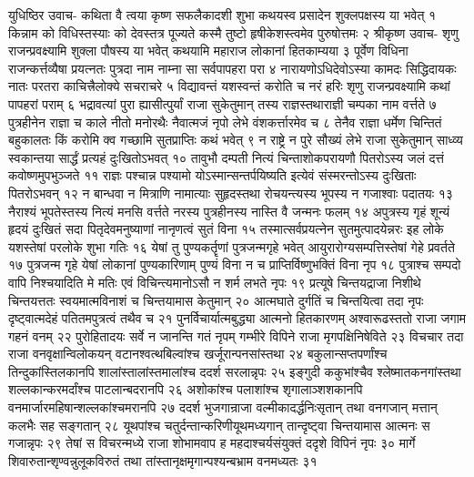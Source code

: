 युधिष्ठिर उवाच-
कथिता वै त्वया कृष्ण सफलैकादशी शुभा 
कथयस्व प्रसादेन शुक्लपक्षस्य या भवेत् १
किन्नाम को विधिस्तस्याः को देवस्तत्र पूज्यते 
कस्मै तुष्टो हृषीकेशस्त्वमेव पुरुषोत्तमः २
श्रीकृष्ण उवाच-
शृणु राजन्प्रवक्ष्यामि शुक्ला पौषस्य या भवेत् 
कथयामि महाराज लोकानां हितकाम्यया ३
पूर्वेण विधिना राजन्कर्त्तव्यैषा प्रयत्नतः 
पुत्रदा नाम नाम्ना सा सर्वपापहरा परा ४
नारायणोऽधिदेवोऽस्या कामदः सिद्धिदायकः 
नातः परतरा काचित्त्रैलोक्ये सचराचरे ५
विद्यावन्तं यशस्वन्तं करोति च नरं हरिः 
शृणु राजन्प्रवक्ष्यामि कथां पापहरां पराम् ६
भद्रावत्यां पुरा ह्यासीत्पुर्यां राजा सुकेतुमान् 
तस्य राज्ञस्तथाराज्ञी चम्पका नाम वर्त्तते ७
पुत्रहीनेन राज्ञा च काले नीतो मनोरथैः 
नैवात्मजं नृपो लेभे वंशकर्त्तारमेव च ८
तेनैव राज्ञा धर्मेण चिन्तितं बहुकालतः 
किं करोमि क्व गच्छामि सुतप्राप्तिः कथं भवेत् ९
न राष्ट्रे न पुरे सौख्यं लेभे राजा सुकेतुमान् 
साध्व्य स्वकान्तया सार्द्धं प्रत्यहं दुःखितोऽभवत् १०
तावुभौ दम्पती नित्यं चिन्ताशोकपरायणौ 
पितरोऽस्य जलं दत्तं कवोष्णमुपभुञ्जते ११
राज्ञः पश्चान्न पश्यामो योऽस्मान्सन्तर्पयिष्यति 
इत्येवं संस्मरन्तोऽस्य दुःखिताः पितरोऽभवन् १२
न बान्धवा न मित्राणि नामात्याः सुहृदस्तथा 
रोचयन्त्यस्य भूपस्य न गजाश्वाः पदातयः १३
नैराश्यं भूपतेस्तस्य नित्यं मनसि वर्त्तते 
नरस्य पुत्रहीनस्य नास्ति वै जन्मनः फलम् १४
अपुत्रस्य गृहं शून्यं हृदयं दुःखितं सदा 
पितृदेवमनुष्याणां नानृणत्वं सुतं विना १५
तस्मात्सर्वप्रयत्नेन सुतमुत्पादयेन्नरः 
इह लोके यशस्तेषां परलोके शुभा गतिः १६
येषां तु पुण्यकर्तॄणां पुत्रजन्मगृहे भवेत् 
आयुरारोग्यसम्पत्तिस्तेषां गेहे प्रवर्तते १७
पुत्रजन्म गृहे येषां लोकानां पुण्यकारिणाम् 
पुण्यं विना न च प्राप्तिर्विष्णुभक्तिं विना नृप १८
पुत्राश्च सम्पदो वापि निश्चयादिति मे मतिः 
एवं विचिन्त्यमानोऽसौ न शर्म लभते नृपः १९
प्रत्यूषे चिन्तयद्राजा निशीथे चिन्तयत्ततः 
स्वयमात्मविनाशं च चिन्तयामास केतुमान् २०
आत्मघाते दुर्गतिं च चिन्तयित्वा तदा नृपः 
दृष्ट्वात्मदेहं पतितमपुत्रत्वं तथैव च २१
पुनर्विचार्यात्मबुद्ध्या आत्मनो हितकारणम् 
अश्वारूढस्ततो राजा जगाम गहनं वनम् २२
पुरोहितादयः सर्वे न जानन्ति गतं नृपम् 
गम्भीरे विपिने राजा मृगपक्षिनिषेविते २३
विचचार तदा राजा वनवृक्षान्विलोकयन् 
वटानश्वत्थबिल्वांश्च खर्जूरान्पनसांस्तथा २४
बकुलान्सप्तपर्णांश्च तिन्दुकांस्तिलकानपि 
शालांस्तालांस्तमालांश्च ददर्श सरलान्नृपः २५
इङ्गुदी ककुभांश्चैव श्लेष्मातकनगांस्तथा 
शल्लकान्करमर्दांश्च पाटलान्बदरानपि २६
अशोकांश्च पलाशांश्च शृगालाञ्शशकानपि 
वनमार्जारमहिषान्शल्लकांश्चमरानपि २७
ददर्श भुजगान्राजा वल्मीकादर्द्धनिःसृतान् 
तथा वनगजान् मत्तान् कलभैः सह सङ्गतान् २८
यूथपांश्च चतुर्दन्तान्करिणीयूथमध्यगान् 
तान्दृष्ट्वा चिन्तयामास आत्मनः स गजान्नृपः २९
तेषां स विचरन्मध्ये राजा शोभामवाप ह 
महदाश्चर्यसंयुक्तं ददृशे विपिनं नृपः ३०
मार्गे शिवारुतान्शृण्वन्नुलूकविरुतं तथा 
तांस्तानृक्षमृगान्पश्यन्बभ्राम वनमध्यतः ३१
